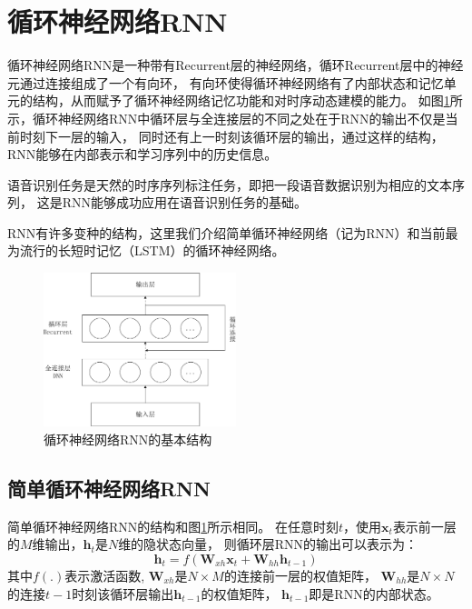 \section{循环神经网络RNN}

循环神经网络RNN是一种带有Recurrent层的神经网络，循环Recurrent层中的神经元通过连接组成了一个有向环，
有向环使得循环神经网络有了内部状态和记忆单元的结构，从而赋予了循环神经网络记忆功能和对时序动态建模的能力。
如图\ref{fig:rnn}所示，循环神经网络RNN中循环层与全连接层的不同之处在于RNN的输出不仅是当前时刻下一层的输入，
同时还有上一时刻该循环层的输出，通过这样的结构，RNN能够在内部表示和学习序列中的历史信息。

语音识别任务是天然的时序序列标注任务，即把一段语音数据识别为相应的文本序列，
这是RNN能够成功应用在语音识别任务的基础。

RNN有许多变种的结构，这里我们介绍简单循环神经网络（记为RNN）和当前最为流行的长短时记忆（LSTM）的循环神经网络。


\begin{figure}[htbp]
\centering
\includegraphics[width=0.5\textwidth]{figures/chapter3/rnn-crop}
\caption{循环神经网络RNN的基本结构}
\label{fig:rnn}
\end{figure}

\subsection{简单循环神经网络RNN}

简单循环神经网络RNN的结构和图\ref{fig:rnn}所示相同。
在任意时刻$t$，使用$\textbf{x}_t$表示前一层的$M$维输出，$\textbf{h}_t$是$N$维的隐状态向量，
则循环层RNN的输出可以表示为：
\begin{equation}
\textbf{h}_t = f({\textbf{W}_{xh}}{\textbf{x}_t} + {\textbf{W}_{hh}}{\textbf{h}_{t-1}})
\end{equation}
其中$f(.)$表示激活函数, $\textbf{W}_{xh}$是$N \times M$的连接前一层的权值矩阵，
$\textbf{W}_{hh}$是$N \times N$的连接$t-1$时刻该循环层输出$\textbf{h}_{t-1}$的权值矩阵，
$\textbf{h}_{t-1}$即是RNN的内部状态。

